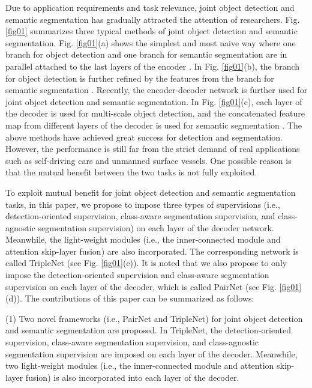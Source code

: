 \documentclass[10pt,twocolumn,letterpaper]{article}
\begin{document}
Due to application requirements and task relevance, joint object detection and semantic segmentation has gradually attracted the attention of researchers. Fig. \ref{fig01} summarizes three typical methods of joint object detection and semantic segmentation. Fig. \ref{fig01}(a) shows the simplest and most naive way where one branch for object detection and one branch for semantic segmentation are in parallel attached to the last layers of the encoder \cite{Brazil_SDSRCNN_ICCV_2017}.  In Fig. \ref{fig01}(b), the branch for object detection is further refined by the features from the branch for semantic segmentation \cite{Mao_Hyper_CVPR_2017,Zhang_DES_CVPR_2018}. Recently, the encoder-decoder network is further used for joint object detection and semantic segmentation. In Fig. \ref{fig01}(c), each layer of the decoder is used for multi-scale object detection, and the concatenated feature map from different layers of the decoder is used for semantic segmentation \cite{Dvornik_Blitznet_ICCV_2017}. The above methods have achieved great success for detection and segmentation. However, the performance is still far from the strict demand of real applications such as self-driving cars and unmanned surface vessels. One possible reason is that the mutual benefit between the two tasks is not fully exploited.

To exploit mutual benefit for joint object detection and semantic segmentation tasks, in this paper, we propose to impose three types of supervisions (i.e., detection-oriented supervision, class-aware segmentation supervision, and class-agnostic segmentation supervision) on each layer of the decoder network. Meanwhile, the light-weight modules (i.e., the inner-connected module and attention skip-layer fusion) are also incorporated. The corresponding network is called TripleNet (see Fig. \ref{fig01}(e)). It is noted that we also propose to only impose the detection-oriented supervision and class-aware segmentation supervision on each layer of the decoder, which is called PairNet (see Fig. \ref{fig01}(d)). The contributions of this paper can be summarized as follows:

(1) Two novel frameworks (i.e., PairNet and TripleNet) for joint object detection and semantic segmentation are proposed. In TripleNet, the detection-oriented supervision, class-aware segmentation supervision, and class-agnostic segmentation supervision are imposed on each layer of the decoder. Meanwhile, two light-weight modules (i.e., the inner-connected module and attention skip-layer fusion) is also incorporated into each layer of the decoder.
\end{document}
